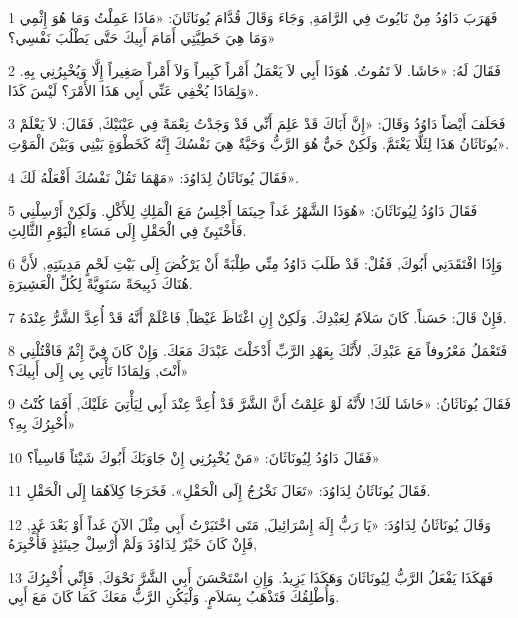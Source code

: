 \par 1 فَهَرَبَ دَاوُدُ مِنْ نَايُوتَ فِي الرَّامَةِ, وَجَاءَ وَقَالَ قُدَّامَ يُونَاثَانَ: «مَاذَا عَمِلْتُ وَمَا هُوَ إِثْمِي وَمَا هِيَ خَطِيَّتِي أَمَامَ أَبِيكَ حَتَّى يَطْلُبَ نَفْسِي؟»
\par 2 فَقَالَ لَهُ: «حَاشَا. لاَ تَمُوتُ. هُوَذَا أَبِي لاَ يَعْمَلُ أَمْراً كَبِيراً وَلاَ أَمْراً صَغِيراً إِلَّا وَيُخْبِرُنِي بِهِ. وَلِمَاذَا يُخْفِي عَنِّي أَبِي هَذَا الأَمْرَ؟ لَيْسَ كَذَا».
\par 3 فَحَلَفَ أَيْضاً دَاوُدُ وَقَالَ: «إِنَّ أَبَاكَ قَدْ عَلِمَ أَنِّي قَدْ وَجَدْتُ نِعْمَةً فِي عَيْنَيْكَ, فَقَالَ: لاَ يَعْلَمْ يُونَاثَانُ هَذَا لِئَلَّا يَغْتَمَّ. وَلَكِنْ حَيٌّ هُوَ الرَّبُّ وَحَيَّةٌ هِيَ نَفْسُكَ إِنَّهُ كَخَطْوَةٍ بَيْنِي وَبَيْنَ الْمَوْتِ».
\par 4 فَقَالَ يُونَاثَانُ لِدَاوُدَ: «مَهْمَا تَقُلْ نَفْسُكَ أَفْعَلْهُ لَكَ».
\par 5 فَقَالَ دَاوُدُ لِيُونَاثَانَ: «هُوَذَا الشَّهْرُ غَداً حِينَمَا أَجْلِسُ مَعَ الْمَلِكِ لِلأَكْلِ. وَلَكِنْ أَرْسِلْنِي فَأَخْتَبِئَ فِي الْحَقْلِ إِلَى مَسَاءِ الْيَوْمِ الثَّالِثِ.
\par 6 وَإِذَا افْتَقَدَنِي أَبُوكَ, فَقُلْ: قَدْ طَلَبَ دَاوُدُ مِنِّي طِلْبَةً أَنْ يَرْكُضَ إِلَى بَيْتِ لَحْمٍ مَدِينَتِهِ, لأَنَّ هُنَاكَ ذَبِيحَةً سَنَوِيَّةً لِكُلِّ الْعَشِيرَةِ.
\par 7 فَإِنْ قَالَ: حَسَناً. كَانَ سَلاَمٌ لِعَبْدِكَ. وَلَكِنْ إِنِ اغْتَاظَ غَيْظاً, فَاعْلَمْ أَنَّهُ قَدْ أُعِدَّ الشَّرُّ عِنْدَهُ.
\par 8 فَتَعْمَلُ مَعْرُوفاً مَعَ عَبْدِكَ, لأَنَّكَ بِعَهْدِ الرَّبِّ أَدْخَلْتَ عَبْدَكَ مَعَكَ. وَإِنْ كَانَ فِيَّ إِثْمٌ فَاقْتُلْنِي أَنْتَ, وَلِمَاذَا تَأْتِي بِي إِلَى أَبِيكَ؟»
\par 9 فَقَالَ يُونَاثَانُ: «حَاشَا لَكَ! لأَنَّهُ لَوْ عَلِمْتُ أَنَّ الشَّرَّ قَدْ أُعِدَّ عِنْدَ أَبِي لِيَأْتِيَ عَلَيْكَ, أَفَمَا كُنْتُ أُخْبِرُكَ بِهِ؟»
\par 10 فَقَالَ دَاوُدُ لِيُونَاثَانَ: «مَنْ يُخْبِرُنِي إِنْ جَاوَبَكَ أَبُوكَ شَيْئاً قَاسِياً؟»
\par 11 فَقَالَ يُونَاثَانُ لِدَاوُدَ: «تَعَالَ نَخْرُجُ إِلَى الْحَقْلِ». فَخَرَجَا كِلاَهُمَا إِلَى الْحَقْلِ.
\par 12 وَقَالَ يُونَاثَانُ لِدَاوُدَ: «يَا رَبُّ إِلَهَ إِسْرَائِيلَ, مَتَى اخْتَبَرْتُ أَبِي مِثْلَ الآنَ غَداً أَوْ بَعْدَ غَدٍ, فَإِنْ كَانَ خَيْرٌ لِدَاوُدَ وَلَمْ أُرْسِلْ حِينَئِذٍ فَأُخْبِرَهُ,
\par 13 فَهَكَذَا يَفْعَلُ الرَّبُّ لِيُونَاثَانَ وَهَكَذَا يَزِيدُ. وَإِنِ اسْتَحْسَنَ أَبِي الشَّرَّ نَحْوَكَ, فَإِنِّي أُخْبِرُكَ وَأُطْلِقُكَ فَتَذْهَبُ بِسَلاَمٍ. وَلْيَكُنِ الرَّبُّ مَعَكَ كَمَا كَانَ مَعَ أَبِي.
